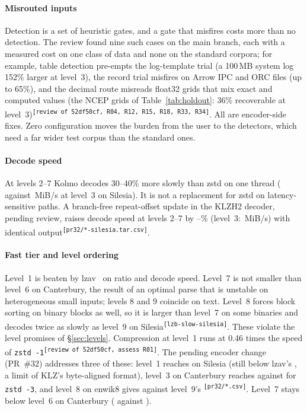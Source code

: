\documentclass[conference]{IEEEtran}
\newcommand{\src}[1]{\textsuperscript{\tiny\color{gray}\texttt{[#1]}}}
\newcommand{\src}[1]{}
\begin{document}
\paragraph*{Misrouted inputs} Detection is a set of heuristic gates, and a gate that misfires costs more than no
detection. The review found nine such cases on the main branch, each with a measured cost on one class of data and
none on the standard corpora; for example, table detection pre-empts the log-template trial (a 100\,MB system log
152\% larger at level~3), the record trial misfires on Arrow IPC and ORC files (up to 65\%), and the decimal route
misreads float32 grids that mix exact and computed values (the NCEP grids of Table~\ref{tab:holdout}: 36\%
recoverable at level~3)\src{review of 52df50cf, R04, R12, R15, R18, R33, R34}. All are encoder-side fixes. Zero configuration moves the burden from the user to
the detectors, which need a far wider test corpus than the standard ones.

\paragraph*{Decode speed} At levels 2--7 Kolmo decodes 30--40\% more slowly than zstd on one thread
(\numSilKThreeD{} against \numSilzstdThreeD\,MiB/s at level~3 on Silesia). It is not a replacement for zstd on latency-sensitive paths. A branch-free
repeat-offset update in the KLZH2 decoder, pending review, raises decode speed at levels 2--7 by
\numDevSilDecGainMin--\numDevSilDecGainMax\% (level~3: \numDevSilThreeD\,MiB/s) with identical output\src{pr32/*-silesia.tar.csv}.

\paragraph*{Fast tier and level ordering} Level~1 is beaten by lzav~\cite{lzav} on ratio and decode speed. Level~7 is not
smaller than level~6 on Canterbury, the result of an optimal parse that is unstable on heterogeneous small inputs;
levels 8 and 9 coincide on text. Level~8 forces block sorting on binary blocks as well, so it is larger than
level~7 on some binaries and decodes twice as slowly as level~9 on Silesia\src{lzb-slow-silesia}. These violate the
level promises of \S\ref{sec:levels}. Compression at level~1 runs at 0.46 times the speed of \texttt{zstd
-1}\src{review of 52df50cf, assess R01}. The pending encoder change
(PR~\#32) addresses three of these: level~1 reaches \numDevSilOneR{} on Silesia (still below lzav's
\numSillzavOneR, a limit of KLZ's byte-aligned format), level~3 on Canterbury reaches \numDevCantThreeR{} against
\numCantZThree{} for \texttt{zstd -3}, and level~8 on enwik8 gives \numDevEnwEightR{} against level~9's
\numDevEnwNineR\src{pr32/*.csv}. Level~7 stays below level~6 on Canterbury
(\numDevCantSevenR{} against \numDevCantSixR).
\end{document}

